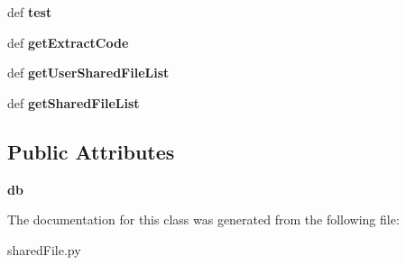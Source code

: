 \begin{DoxyCompactItemize}
\item 
\hypertarget{classweb_1_1shared_file_1_1shared_files_ac8893460c894202fcb96b24d2d1929ed}{def {\bfseries test}}\label{classweb_1_1shared_file_1_1shared_files_ac8893460c894202fcb96b24d2d1929ed}

\item 
\hypertarget{classweb_1_1shared_file_1_1shared_files_a32805d78bd364f82c485e7b650bd02c0}{def {\bfseries get\-Extract\-Code}}\label{classweb_1_1shared_file_1_1shared_files_a32805d78bd364f82c485e7b650bd02c0}

\item 
\hypertarget{classweb_1_1shared_file_1_1shared_files_a306e98237ec87ca71f35ebabf20f7301}{def {\bfseries get\-User\-Shared\-File\-List}}\label{classweb_1_1shared_file_1_1shared_files_a306e98237ec87ca71f35ebabf20f7301}

\item 
\hypertarget{classweb_1_1shared_file_1_1shared_files_a710188d318a60c6e4d8dd841eaba3a7f}{def {\bfseries get\-Shared\-File\-List}}\label{classweb_1_1shared_file_1_1shared_files_a710188d318a60c6e4d8dd841eaba3a7f}

\end{DoxyCompactItemize}
\subsection*{Public Attributes}
\begin{DoxyCompactItemize}
\item 
\hypertarget{classweb_1_1shared_file_1_1shared_files_a8ee408cb0bc43c60c5274f7d44e49391}{{\bfseries db}}\label{classweb_1_1shared_file_1_1shared_files_a8ee408cb0bc43c60c5274f7d44e49391}

\end{DoxyCompactItemize}


The documentation for this class was generated from the following file\-:\begin{DoxyCompactItemize}
\item 
shared\-File.\-py\end{DoxyCompactItemize}
